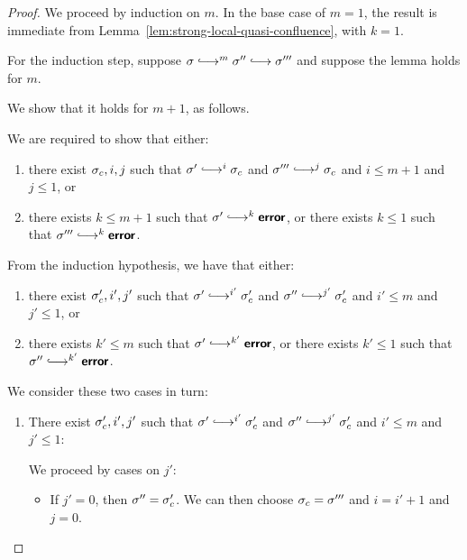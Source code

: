 \begin{proof}
  We proceed by induction on $m$.  In the base case of $m = 1$, the
  result is immediate from
  Lemma~\ref{lem:strong-local-quasi-confluence}, with $k = 1$.

  For the induction step, suppose $\conf \parstepsto^m \conf''
  \parstepsto \conf'''$ and suppose the lemma holds for $m$.

  We show that it holds for $m + 1$, as follows.

  We are required to show that either:
  \begin{enumerate}
    \item there exist $\sigma_c, i,
      j$ such that $\conf' \parstepsto^{i} \conf_c$ and $\conf'''
      \parstepsto^{j} \conf_c$ and $i \leq m + 1$ and $j \leq 1$, or
    \item there exists $k \leq m + 1$ such that $\conf' \parstepsto^k
      \error$, or there exists $k \leq 1$ such that $\conf'''
      \parstepsto^k \error$.
  \end{enumerate}

  From the induction hypothesis, we have that either:
  \begin{enumerate}
    \item there exist $\sigma_c', i',
      j'$ such that $\conf' \parstepsto^{i'} \conf_c'$ and $\conf''
      \parstepsto^{j'} \conf_c'$ and $i' \leq m$ and $j' \leq 1$, or
    \item there exists $k' \leq m$ such that $\conf'
      \parstepsto^{k'} \error$, or there exists $k' \leq 1$ such that
      $\conf'' \parstepsto^{k'} \error$.
  \end{enumerate}

  We consider these two cases in turn:
  \begin{enumerate}
    \item There exist $\sigma_c', i',
      j'$ such that $\conf' \parstepsto^{i'} \conf_c'$ and $\conf''
      \parstepsto^{j'} \conf_c'$ and $i' \leq m$ and $j' \leq 1$:


      We proceed by cases on $j'$:
      \begin{itemize}

      \item If $j' = 0$, then $\sigma'' = \sigma_c'$.  We can then
        choose $\sigma_c = \sigma'''$ and $i = i' + 1$ and $j = 0$.


\end{itemize}
\end{enumerate}
\end{proof}
